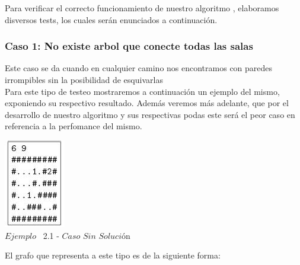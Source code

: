 \indent Para verificar el correcto funcionamiento de nuestro algoritmo , elaboramos disversos tests,
los cuales ser\'an enunciados a continuaci\'on.\\

\begin{center}
 \subsubsection*{Caso 1: No existe arbol que conecte todas las salas}
\end{center}

Este caso se da cuando en cualquier camino nos encontramos con paredes irrompibles sin la posibilidad de esquivarlas\\

 Para este tipo de testeo mostraremos a continuaci\'on un ejemplo del mismo, exponiendo su respectivo resultado. Adem\'as veremos m\'as adelante, que por el desarrollo de nuestro algoritmo y sus respectivas podas este ser\'a el peor caso en referencia a la perfomance del mismo.\\
 
\vspace*{0.3cm} \vspace*{0.3cm}
  \begin{center}
 \includegraphics[scale=1.6]{./EJ2/ej2sinsolucion.jpeg}
\\{$Ejemplo$ \ 2.1 - $Caso$ $Sin$ $Soluci$\'on}
  \end{center}
  \vspace*{0.3cm}

El grafo que representa a este tipo es de la siguiente forma:\\

